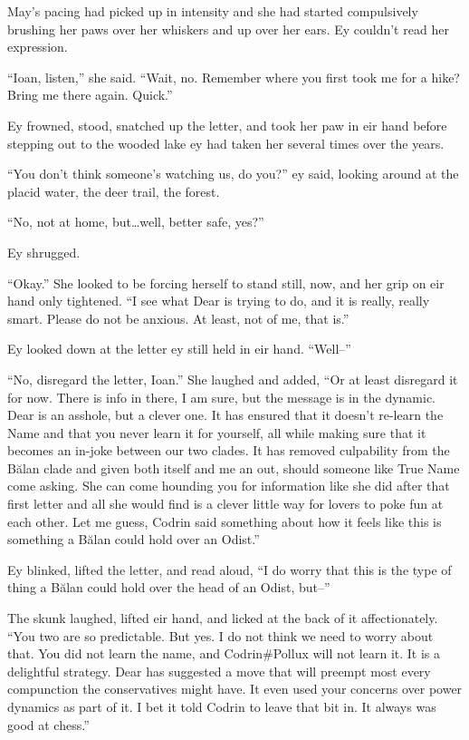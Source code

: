 May's pacing had picked up in intensity and she had started compulsively brushing her paws over her whiskers and up over her ears. Ey couldn't read her expression.

``Ioan, listen,'' she said. ``Wait, no. Remember where you first took me for a hike? Bring me there again. Quick.''

Ey frowned, stood, snatched up the letter, and took her paw in eir hand before stepping out to the wooded lake ey had taken her several times over the years.

``You don't think someone's watching us, do you?'' ey said, looking around at the placid water, the deer trail, the forest.

``No, not at home, but\ldots well, better safe, yes?''

Ey shrugged.

``Okay.'' She looked to be forcing herself to stand still, now, and her grip on eir hand only tightened. ``I see what Dear is trying to do, and it is really, really smart. Please do not be anxious. At least, not of me, that is.''

Ey looked down at the letter ey still held in eir hand. ``Well--''

``No, disregard the letter, Ioan.'' She laughed and added, ``Or at least disregard it for now. There is info in there, I am sure, but the message is in the dynamic. Dear is an asshole, but a clever one. It has ensured that it doesn't re-learn the Name and that you never learn it for yourself, all while making sure that it becomes an in-joke between our two clades. It has removed culpability from the Bălan clade and given both itself and me an out, should someone like True Name come asking. She can come hounding you for information like she did after that first letter and all she would find is a clever little way for lovers to poke fun at each other. Let me guess, Codrin said something about how it feels like this is something a Bălan could hold over an Odist.''

Ey blinked, lifted the letter, and read aloud, ``I do worry that this is the type of thing a Bălan could hold over the head of an Odist, but--''

The skunk laughed, lifted eir hand, and licked at the back of it affectionately. ``You two are so predictable. But yes. I do not think we need to worry about that. You did not learn the name, and Codrin\#Pollux will not learn it. It is a delightful strategy. Dear has suggested a move that will preempt most every compunction the conservatives might have. It even used your concerns over power dynamics as part of it. I bet it told Codrin to leave that bit in. It always was good at chess.''

